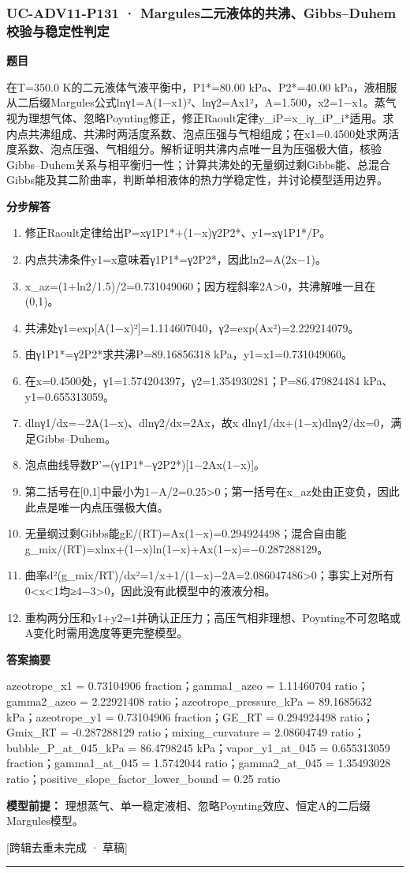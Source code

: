 \documentclass[UTF8,11pt,a4paper]{ctexart}
\begin{document}
\subsubsection*{UC-ADV11-P131 · Margules二元液体的共沸、Gibbs–Duhem校验与稳定性判定}
\noindent\textbf{题目}\par
在T=350.0 K的二元液体气液平衡中，P1*=80.00 kPa、P2*=40.00 kPa，液相服从二后缀Margules公式lnγ1=A(1−x1)²、lnγ2=Ax1²，A=1.500，x2=1−x1。蒸气视为理想气体、忽略Poynting修正，修正Raoult定律y\_iP=x\_iγ\_iP\_i*适用。求内点共沸组成、共沸时两活度系数、泡点压强与气相组成；在x1=0.4500处求两活度系数、泡点压强、气相组分。解析证明共沸内点唯一且为压强极大值，核验Gibbs–Duhem关系与相平衡归一性；计算共沸处的无量纲过剩Gibbs能、总混合Gibbs能及其二阶曲率，判断单相液体的热力学稳定性，并讨论模型适用边界。\par
\medskip\noindent\textbf{分步解答}
\begin{enumerate}
\item 修正Raoult定律给出P=xγ1P1*+(1−x)γ2P2*、y1=xγ1P1*/P。
\item 内点共沸条件y1=x意味着γ1P1*=γ2P2*，因此ln2=A(2x−1)。
\item x\_az=(1+ln2/1.5)/2=0.731049060；因方程斜率2A>0，共沸解唯一且在(0,1)。
\item 共沸处γ1=exp[A(1−x)²]=1.114607040，γ2=exp(Ax²)=2.229214079。
\item 由γ1P1*=γ2P2*求共沸P=89.16856318 kPa，y1=x1=0.731049060。
\item 在x=0.4500处，γ1=1.574204397，γ2=1.354930281；P=86.479824484 kPa、y1=0.655313059。
\item dlnγ1/dx=−2A(1−x)、dlnγ2/dx=2Ax，故x dlnγ1/dx+(1−x)dlnγ2/dx=0，满足Gibbs–Duhem。
\item 泡点曲线导数P'=(γ1P1*−γ2P2*)[1−2Ax(1−x)]。
\item 第二括号在[0,1]中最小为1−A/2=0.25>0；第一括号在x\_az处由正变负，因此此点是唯一内点压强极大值。
\item 无量纲过剩Gibbs能gE/(RT)=Ax(1−x)=0.294924498；混合自由能g\_mix/(RT)=xlnx+(1−x)ln(1−x)+Ax(1−x)=−0.287288129。
\item 曲率d²(g\_mix/RT)/dx²=1/x+1/(1−x)−2A=2.086047486>0；事实上对所有0<x<1均≥4−3>0，因此没有此模型中的液液分相。
\item 重构两分压和y1+y2=1并确认正压力；高压气相非理想、Poynting不可忽略或A变化时需用逸度等更完整模型。
\end{enumerate}
\noindent\textbf{答案摘要}\par
azeotrope\_x1 = 0.73104906 fraction；gamma1\_azeo = 1.11460704 ratio；gamma2\_azeo = 2.22921408 ratio；azeotrope\_pressure\_kPa = 89.1685632 kPa；azeotrope\_y1 = 0.73104906 fraction；GE\_RT = 0.294924498 ratio；Gmix\_RT = -0.287288129 ratio；mixing\_curvature = 2.08604749 ratio；bubble\_P\_at\_045\_kPa = 86.4798245 kPa；vapor\_y1\_at\_045 = 0.655313059 fraction；gamma1\_at\_045 = 1.5742044 ratio；gamma2\_at\_045 = 1.35493028 ratio；positive\_slope\_factor\_lower\_bound = 0.25 ratio\par
\noindent\textbf{模型前提：}
理想蒸气、单一稳定液相、忽略Poynting效应、恒定A的二后缀Margules模型。\par
\noindent\textcolor{red!65!black}{[跨辑去重未完成 · 草稿]} \par
\medskip\hrule\medskip
{}
\end{document}
